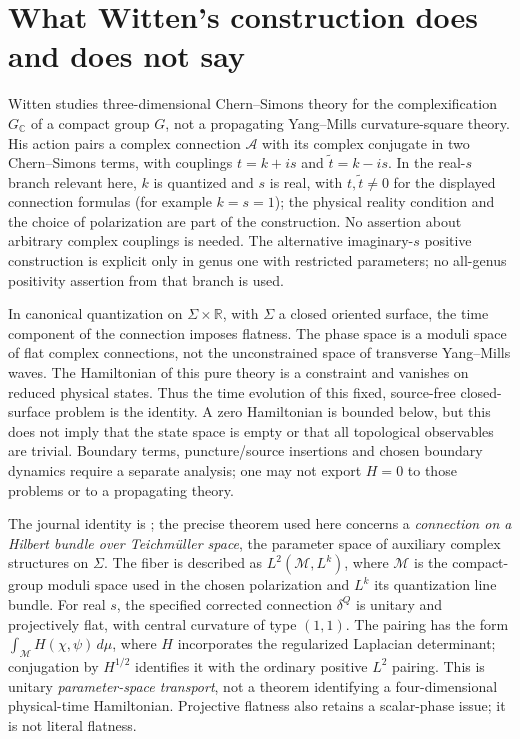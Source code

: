 \section{What Witten's construction does and does not say}
\label{sec:witten}

Witten studies three-dimensional Chern--Simons theory for the
complexification $G_{\mathbb C}$ of a compact group $G$, not a propagating
Yang--Mills curvature-square theory. His action pairs a
complex connection $\mathcal A$ with its complex conjugate in two
Chern--Simons terms, with couplings $t=k+is$ and
$\widetilde t=k-is$. In the real-$s$ branch relevant here, $k$ is
quantized and $s$ is real, with $t,\widetilde t\ne0$ for the displayed
connection formulas (for example $k=s=1$); the physical reality condition and the
choice of polarization are part of the construction. No assertion about
arbitrary complex couplings is needed. The alternative imaginary-$s$
positive construction is explicit only in genus one with restricted
parameters; no all-genus positivity assertion from that branch is used.

In canonical quantization on $\Sigma\times\mathbb R$, with $\Sigma$
a closed oriented surface, the time component of the connection imposes
flatness. The phase space is a moduli space of flat complex connections,
not the unconstrained space of transverse Yang--Mills waves. The
Hamiltonian of this pure theory is a constraint and vanishes on reduced
physical states. Thus the time evolution of this fixed, source-free
closed-surface problem is the identity. A zero Hamiltonian is bounded
below, but this does not imply that the state space is empty or that all
topological observables are trivial. Boundary terms, puncture/source
insertions and chosen boundary dynamics require a separate analysis;
one may not export $H=0$ to those problems or to a propagating theory.

The journal identity is \cite{Witten1991}; the precise theorem used here concerns a \emph{connection on a Hilbert
bundle over Teichm\"uller space}, the parameter space of auxiliary complex
structures on $\Sigma$. The fiber is described as $L^2(\mathcal M,L^k)$,
where $\mathcal M$ is the compact-group moduli space used in the chosen
polarization and $L^k$ its quantization line bundle. For real $s$, the
specified corrected connection $\delta^Q$ is unitary and projectively
flat, with central curvature of type $(1,1).$ The pairing has the form
$\int_{\mathcal M} H(\chi,\psi)\,d\mu$, where $H$ incorporates the
regularized Laplacian determinant; conjugation by $H^{1/2}$ identifies it
with the ordinary positive $L^2$ pairing. This is unitary
\emph{parameter-space transport}, not a theorem identifying a
four-dimensional physical-time Hamiltonian. Projective flatness also
retains a scalar-phase issue; it is not literal flatness.

